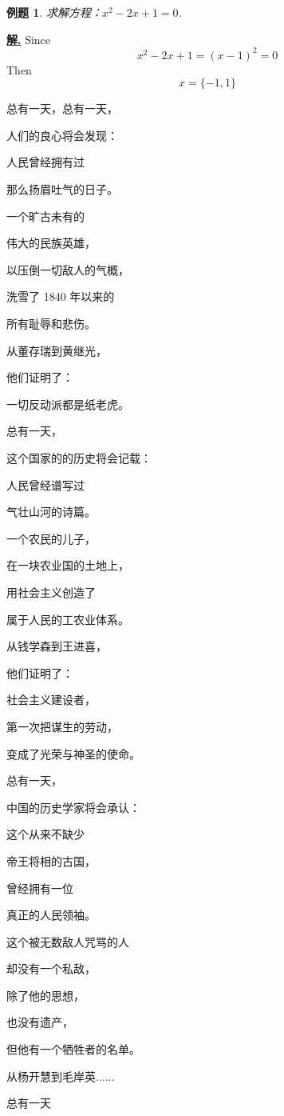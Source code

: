 \documentclass[11pt,twoside,a4paper]{book}
\theoremstyle{thmstyle} %
\theoremstyle{defstyle} %
\theoremstyle{prostyle} %
\newtheorem{example}[theorem]{例题}
\newenvironment{solution}{\par\underline{\textbf{解.}} \;\kaishu}{\par}
\begin{document}
    \begin{example}
    求解方程：\(x^2 - 2 x + 1 = 0\).
    \end{example}

    \begin{solution}
    Since \[x^2 - 2 x + 1 = (x - 1)^2 = 0\]
    Then \[x = \{-1,1\}\]
    \end{solution}
    总有一天，总有一天，

人们的良心将会发现：

人民曾经拥有过

那么扬眉吐气的日子。

一个旷古未有的

伟大的民族英雄，

以压倒一切敌人的气概，

洗雪了 1840 年以来的

所有耻辱和悲伤。

从董存瑞到黄继光，

他们证明了：

一切反动派都是纸老虎。

总有一天，

这个国家的的历史将会记载：

人民曾经谱写过

气壮山河的诗篇。

一个农民的儿子，

在一块农业国的土地上，

用社会主义创造了

属于人民的工农业体系。

从钱学森到王进喜，

他们证明了：

社会主义建设者，

第一次把谋生的劳动，

变成了光荣与神圣的使命。

总有一天，

中国的历史学家将会承认：

这个从来不缺少

帝王将相的古国，

曾经拥有一位

真正的人民领袖。

这个被无数敌人咒骂的人

却没有一个私敌，

除了他的思想，

也没有遗产，

但他有一个牺牲者的名单。

从杨开慧到毛岸英......

总有一天
\end{document}
